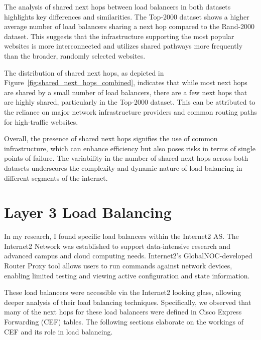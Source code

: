 \documentclass[12pt]{cwru_thesis}
\begin{document}
The analysis of shared next hops between load balancers in both datasets highlights key differences and similarities. The Top-2000 dataset shows a higher average number of load balancers sharing a next hop compared to the Rand-2000 dataset. This suggests that the infrastructure supporting the most popular websites is more interconnected and utilizes shared pathways more frequently than the broader, randomly selected websites.

The distribution of shared next hops, as depicted in Figure~\ref{fig:shared_next_hops_combined}, indicates that while most next hops are shared by a small number of load balancers, there are a few next hops that are highly shared, particularly in the Top-2000 dataset. This can be attributed to the reliance on major network infrastructure providers and common routing paths for high-traffic websites.

Overall, the presence of shared next hops signifies the use of common infrastructure, which can enhance efficiency but also poses risks in terms of single points of failure. The variability in the number of shared next hops across both datasets underscores the complexity and dynamic nature of load balancing in different segments of the internet.


\chapter{Layer 3 Load Balancing}
In my research, I found specific load balancers within the Internet2 AS. The Internet2 Network was established to support data-intensive research and advanced campus and cloud computing needs. Internet2's GlobalNOC-developed Router Proxy tool allows users to run commands against network devices, enabling limited testing and viewing active configuration and state information.

These load balancers were accessible via the Internet2 looking glass, allowing deeper analysis of their load balancing techniques. Specifically, we observed that many of the next hops for these load balancers were defined in Cisco Express Forwarding (CEF) tables. The following sections elaborate on the workings of CEF and its role in load balancing.
\end{document}
